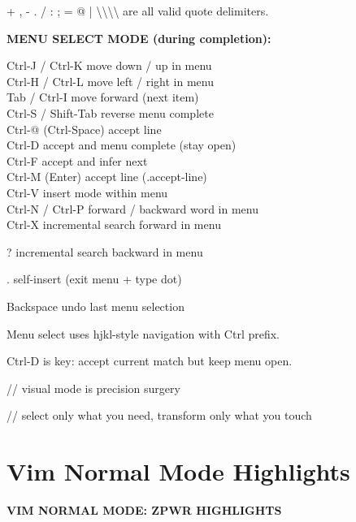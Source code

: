 \documentclass[11pt,a4paper,twoside]{book}
\begin{document}
+ , - . / : ; = @ | \textbackslash{}\textbackslash{}\textbackslash{}\textbackslash{} are all valid quote delimiters.


\vspace{12pt}
{\bfseries\color{neonyellow} MENU SELECT MODE (during completion):}\vspace{4pt}

\begin{codebox}
Ctrl-J / Ctrl-K       move down / up in menu\\
Ctrl-H / Ctrl-L       move left / right in menu\\
Tab / Ctrl-I          move forward (next item)\\
Ctrl-S / Shift-Tab    reverse menu complete\\
Ctrl-@ (Ctrl-Space)   accept line\\
Ctrl-D                accept and menu complete (stay open)\\
Ctrl-F                accept and infer next\\
Ctrl-M (Enter)        accept line (.accept-line)\\
Ctrl-V                insert mode within menu\\
Ctrl-N / Ctrl-P       forward / backward word in menu\\
Ctrl-X                incremental search forward in menu\\
\end{codebox}

?                     incremental search backward in menu

.                     self-insert (exit menu + type dot)

Backspace             undo last menu selection

Menu select uses hjkl-style navigation with Ctrl prefix.

Ctrl-D is key: accept current match but keep menu open.

// visual mode is precision surgery

// select only what you need, transform only what you touch


\vspace{16pt}

\section{Vim Normal Mode Highlights}


\vspace{10pt}
{\large\bfseries\color{neoncyan} VIM NORMAL MODE: ZPWR HIGHLIGHTS}\vspace{6pt}
\end{document}
